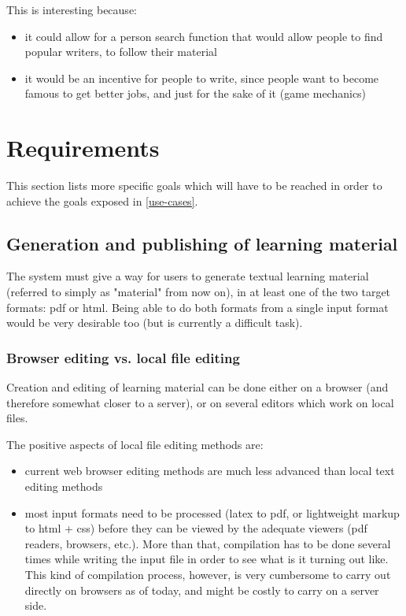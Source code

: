 \documentclass[12pt]{article}
\begin{document}
This is interesting because:

\begin{itemize}
  \item it could allow for a person search function that would allow people to find popular writers, to follow their material
  \item it would be an incentive for people to write, since people want to become famous to get better jobs, and just for the sake of it (game mechanics)
\end{itemize}

\section{Requirements} \label{requirements}

This section lists more specific goals which will have to be reached in order to achieve the goals exposed in \ref{use-cases}.

\subsection{Generation and publishing of learning material}

The system must give a way for users to generate textual learning material (referred to simply as "material" from now on), in at least one of the two target formats: pdf or html. Being able to do both formats from a single input format would be very desirable too (but is currently a difficult task).

\subsubsection{Browser editing vs. local file editing}

Creation and editing of learning material can be done either on a browser (and therefore somewhat closer to a server), or on several editors which work on local files.

  The positive aspects of local file editing methods are:
  \begin{itemize}
    \item current web browser editing methods are much less advanced than local text editing methods
    \item most input formats need to be processed (latex to pdf, or lightweight markup to html + css) before they can be viewed by the adequate viewers (pdf readers, browsers, etc.). More than that, compilation has to be done several times while writing the input file in order to see what is it turning out like. This kind of compilation process, however, is very cumbersome to carry out directly on browsers as of today, and might be costly to carry on a server side.
  \end{itemize}    
  
\end{document}
